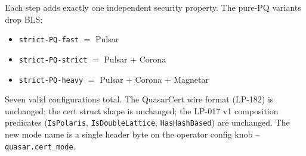 Each step adds exactly one independent security property. The
pure-PQ variants drop BLS:

\begin{itemize}[leftmargin=2em,nosep]
\item \texttt{strict-PQ-fast} $=$ Pulsar
\item \texttt{strict-PQ-strict} $=$ Pulsar + Corona
\item \texttt{strict-PQ-heavy} $=$ Pulsar + Corona + Magnetar
\end{itemize}

Seven valid configurations total. The QuasarCert wire format
(LP-182) is unchanged; the cert struct shape is unchanged; the
LP-017 v1 composition predicates (\texttt{IsPolaris},
\texttt{IsDoubleLattice}, \texttt{HasHashBased}) are unchanged.
The new mode name is a single header byte on the operator config
knob -- \texttt{quasar.cert\_mode}.
